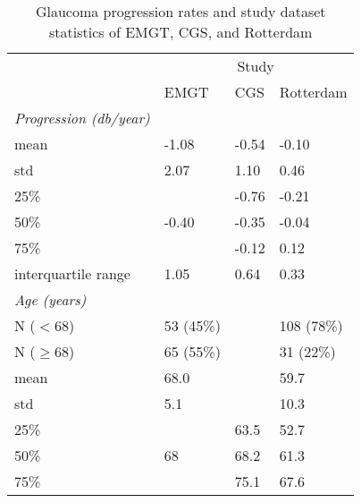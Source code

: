 \begin{table}[h]
\centering
\caption{Glaucoma progression rates and study dataset statistics of \acs{EMGT}, \acs{CGS}, and Rotterdam}
\label{tab:glaucprogress}
\begin{tabular}{@{}llll@{}}
	\toprule
	                               &                      \multicolumn{3}{c}{Study}                       \\
	\cmidrule{2-4}                 & \acs{EMGT} \cite{Heijl2009} & \acs{CGS} \cite{Group2010} & Rotterdam \\ \midrule
	\textit{Progression (db/year)} &                             &                            &           \\
	mean                           & -1.08                       & -0.54                      & -0.10     \\
	std                            & 2.07                        & 1.10                       & 0.46      \\
	25\%                           &                             & -0.76                      & -0.21     \\
	50\%                           & -0.40                       & -0.35                      & -0.04     \\
	75\%                           &                             & -0.12                      & 0.12      \\
	interquartile range            & 1.05                        & 0.64                       & 0.33      \\ \midrule
	\textit{Age (years)}           &                             &                            &           \\
	N ($<68$)                      & 53 (45\%)                    &                            & 108 (78\%)          \\
	N ($\geq68$)                   & 65 (55\%)                    &                            & 31 (22\%)          \\
	mean                           & 68.0                        &                            & 59.7          \\
	std                            & 5.1                         &                            & 10.3         \\
	25\%                           &                             & 63.5                       & 52.7         \\
	50\%                           & 68                          & 68.2                       & 61.3          \\
	75\%                           &                             & 75.1                       & 67.6          \\ \bottomrule
\end{tabular}
\end{table}

